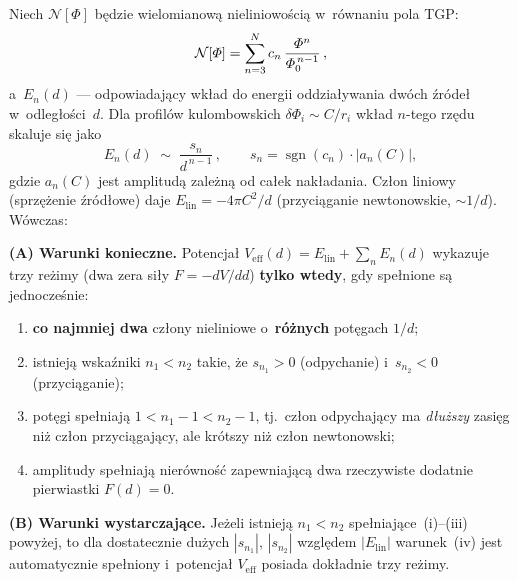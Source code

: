 \begin{theorem}%
\label{thm:uniqueness}
Niech $\mathcal{N}[\Phi]$ b\k{e}dzie wielomianow\k{a} nieliniowo\'sci\k{a}
w~r\'ownaniu pola TGP:
\begin{equation}\label{eq:N-polynomial}
  \mathcal{N}[\varPhi]
  = \sum_{n=3}^{N} c_n\,\frac{\varPhi^n}{\varPhi_0^{\,n-1}}\,,
\end{equation}
a~$E_n(d)$ --- odpowiadaj\k{a}cy wk\l{}ad do energii oddzia\l{}ywania
dw\'och \'zr\'ode\l{} w~odleg\l{}o\'sci~$d$. Dla profil\'ow
kulombowskich $\delta\Phi_i \sim C/r_i$ wk\l{}ad $n$-tego rz\k{e}du
skaluje si\k{e} jako
\begin{equation}\label{eq:En-scaling}
  E_n(d) \;\sim\; \frac{s_n}{d^{\,n-1}}\,,
  \qquad s_n = \operatorname{sgn}(c_n) \cdot |a_n(C)|,
\end{equation}
gdzie $a_n(C)$ jest amplitud\k{a} zale\.zn\k{a} od ca\l{}ek nak\l{}adania.
Cz\l{}on liniowy (sprz\k{e}\.zenie \'zr\'od\l{}owe) daje $E_{\mathrm{lin}}
= -4\pi C^2/d$ (przyci\k{a}ganie newtonowskie, $\sim 1/d$). W\'owczas:

\medskip
\noindent\textbf{(A) Warunki konieczne.}
Potencja\l{} $V_{\mathrm{eff}}(d) = E_{\mathrm{lin}} + \sum_n E_n(d)$
wykazuje trzy re\.zimy (dwa zera si\l{}y $F = -dV/dd$) \textbf{tylko wtedy},
gdy spe\l{}nione s\k{a} jednocze\'snie:
\begin{enumerate}[label=(\roman*),nosep]
  \item \textbf{co najmniej dwa} cz\l{}ony nieliniowe o~\textbf{r\'o\.znych}
        pot\k{e}gach $1/d$;
  \item istniej\k{a} wska\'zniki $n_1 < n_2$ takie, \.ze $s_{n_1} > 0$
        (odpychanie) i~$s_{n_2} < 0$ (przyci\k{a}ganie);
  \item pot\k{e}gi spe\l{}niaj\k{a} $1 < n_1{-}1 < n_2{-}1$, tj.\
        cz\l{}on odpychaj\k{a}cy ma \emph{d\l{}u\.zszy} zasi\k{e}g ni\.z
        cz\l{}on przyci\k{a}gaj\k{a}cy, ale kr\'otszy ni\.z cz\l{}on
        newtonowski;
  \item amplitudy spe\l{}niaj\k{a} nier\'owno\'s\'c zapewniaj\k{a}c\k{a}
        dwa rzeczywiste dodatnie pierwiastki $F(d) = 0$.
\end{enumerate}

\medskip
\noindent\textbf{(B) Warunki wystarczaj\k{a}ce.}
Je\.zeli istniej\k{a} $n_1 < n_2$ spe\l{}niaj\k{a}ce~(i)--(iii) powy\.zej,
to dla dostatecznie du\.zych $|s_{n_1}|$, $|s_{n_2}|$ wzgl\k{e}dem
$|E_{\mathrm{lin}}|$ warunek~(iv) jest automatycznie spe\l{}niony
i~potencja\l{} $V_{\mathrm{eff}}$ posiada dok\l{}adnie trzy re\.zimy.


\end{theorem}
